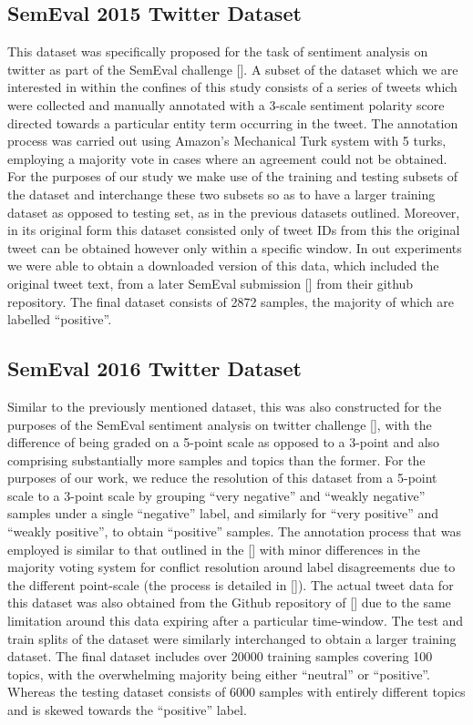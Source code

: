 \documentclass[12pt, a4paper]{report}
\theoremstyle{definition}
\theoremstyle{definition}%
\theoremstyle{definition}%
\theoremstyle{definition}%
\theoremstyle{definition}%
\theoremstyle{definition}%
\renewcommand{\cite}[1]{[\citealp{#1}]}
\begin{document}
\subsection{SemEval 2015 Twitter Dataset}
This dataset was specifically proposed for the task of sentiment analysis on twitter as part of the SemEval challenge \cite{rosenthal2015}. A subset of the dataset which we are interested in within the confines of this study consists of a series of tweets which were collected and manually annotated with a 3-scale sentiment polarity score directed towards a particular entity term occurring in the tweet. The annotation process was carried out using Amazon's Mechanical Turk system with 5 turks, employing a majority vote in cases where an agreement could not be obtained. For the purposes of our study we make use of the training and testing subsets of the dataset and interchange these two subsets so as to have a larger training dataset as opposed to testing set, as in the previous datasets outlined. Moreover, in its original form this dataset consisted only of tweet IDs  from this the original tweet can be obtained however only within a specific window. In out experiments we were able to obtain a  downloaded version of this data, which included the original tweet text, from a later SemEval submission \cite{baziotis2017} from their github repository. The final dataset consists of 2872 samples, the majority of which are labelled \enquote{positive}.

\subsection{SemEval 2016 Twitter Dataset}
Similar to the previously mentioned dataset, this was also constructed for the purposes of the SemEval sentiment analysis on twitter challenge \cite{nakov2016}, with the difference of being graded on a 5-point scale as opposed to a 3-point and also comprising substantially more samples and topics than the former. For the purposes of our work, we reduce the resolution of this dataset from a 5-point scale to a 3-point scale by grouping \enquote{very negative} and \enquote{weakly negative} samples under a single \enquote{negative} label, and similarly for \enquote{very positive} and \enquote{weakly positive}, to obtain \enquote{positive} samples. The annotation process that was employed is similar to that outlined in the \cite{rosenthal2015} with minor differences in the majority voting system for conflict resolution around label disagreements due to the different point-scale (the process is detailed in \cite{nakov2016}). The actual tweet data for this dataset was also obtained from the Github repository of \cite{baziotis2017} due to the same limitation around this data expiring after a particular time-window. The test and train splits of the dataset were similarly interchanged to obtain a larger training dataset. The final dataset includes over 20000 training samples covering 100 topics, with the overwhelming majority being either \enquote{neutral} or \enquote{positive}. Whereas the testing dataset consists of 6000 samples with entirely different topics and is skewed towards the \enquote{positive} label.
\end{document}
